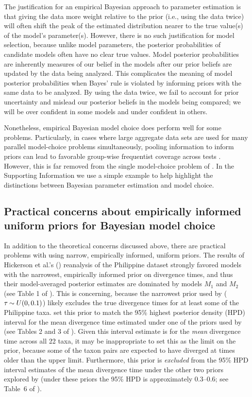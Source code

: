 The justification for an empirical Bayesian approach to parameter estimation is
that giving the data more weight relative to the prior (i.e., using the data
twice) will often shift the peak of the estimated distribution nearer to the
true value(s) of the model's parameter(s).
However, there is no such justification for model selection, because unlike
model parameters, the posterior probabilities of candidate models often have no
clear true values.
Model posterior probabilities are inherently measures of our belief in the
models after our prior beliefs are updated by the data being analyzed.
This complicates the meaning of model posterior probabilities when Bayes' rule
is violated by informing priors with the same data to be analyzed.
By using the data twice, we fail to account for prior uncertainty and mislead
our posterior beliefs in the models being compared; we will be over confident
in some models and under confident in others.

Nonetheless, empirical Bayesian model choice does perform well for some
problems.
Particularly, in cases where large aggregate data sets are used for many
parallel model-choice problems simultaneously, pooling information to inform
priors can lead to favorable group-wise frequentist coverage across tests
\citep{Efron2008}.
However, this is far removed from the single model-choice problem of \msb.
In the Supporting Information we use a simple example to help highlight the
distinctions between Bayesian parameter estimation and model choice.

\subsection{Practical concerns about empirically informed uniform priors for
    Bayesian model choice}
In addition to the theoretical concerns discussed above, there are practical
problems with using narrow, empirically informed, uniform priors.
The results of Hickerson et al.'s (\citeyear{Hickerson2013}) reanalysis of the
Philippine dataset strongly favored models with the narrowest, empirically
informed prior on divergence times, and thus their model-averaged posterior
estimates are dominated by models $M_1$ and $M_2$ (see Table 1 of
\citet{Hickerson2013}).
This is concerning, because the narrowest \divt{} prior used by
\citet{Hickerson2013} ($\tau_{} \sim U(0,0.1)$) likely excludes the true
divergence times for at least some of the Philippine taxa.
\citet{Hickerson2013} set this prior to match the 95\% highest posterior
density (HPD) interval for the mean divergence time estimated under one of the
priors used by \citet{Oaks2012} (see Tables 2 and 3 of \citet{Oaks2012}).
Given this interval estimate is for the \emph{mean} divergence time across all
22 taxa, it may be inappropriate to set this as the limit on the prior, because
some of the taxon pairs are expected to have diverged at times older than the
upper limit.
Furthermore, this prior is \emph{excluded} from the 95\% HPD interval estimates
of the mean divergence time under the other two priors explored by
\citet{Oaks2012} (under these priors the 95\% HPD is approximately 0.3--0.6;
see Table~6 of \citet{Oaks2012}).

